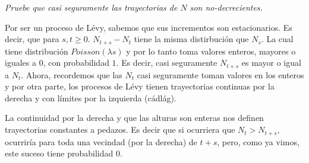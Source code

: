 \emph{
	Pruebe que casi seguramente las trayectorias de $N$ son no-decrecientes.
}

\afterstatement\pn

Por ser un proceso de Lévy, sabemos que sus incrementos son estacionarios. Es decir, que para $s,t \geq 0$.
$N_{t+s} - N_t$ tiene la misma distirbución que $N_s$. La cual tiene distribución $Poisson(\lambda s)$ y
por lo tanto toma valores enteros, mayores o iguales a $0$, con probabilidad $1$. Es decir, casi seguramente
$N_{t+s}$ es mayor o igual a $N_t$. Ahora, recordemos que las $N_t$ casi seguramente toman valores en los 
enteros y por otra parte, los procesos de Lévy tienen trayectorias continuas por la derecha y con límites 
por la izquierda (cádlág).\pn

La continuidad por la derecha y que las alturas son enteras nos definen trayectorias constantes a pedazos.
Es decir que si ocurriera que $N_t > N_{t+s}$, ocurriría para toda una vecindad (por la derecha) de $t+s$, 
pero, como ya vimos, este suceso tiene probabilidad $0$.